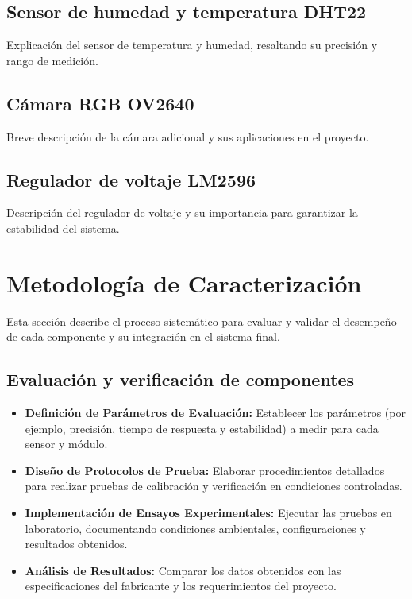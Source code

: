 \subsection{Sensor de humedad y temperatura DHT22}
Explicación del sensor de temperatura y humedad, resaltando su precisión y rango de medición.

\subsection{Cámara RGB OV2640}
Breve descripción de la cámara adicional y sus aplicaciones en el proyecto.

\subsection{Regulador de voltaje LM2596}
Descripción del regulador de voltaje y su importancia para garantizar la estabilidad del sistema.

\section{Metodología de Caracterización}
Esta sección describe el proceso sistemático para evaluar y validar el desempeño de cada componente y su integración en el sistema final.

\subsection{Evaluación y verificación de componentes}
\begin{itemize}
    \item \textbf{Definición de Parámetros de Evaluación:} Establecer los parámetros (por ejemplo, precisión, tiempo de respuesta y estabilidad) a medir para cada sensor y módulo.
    \item \textbf{Diseño de Protocolos de Prueba:} Elaborar procedimientos detallados para realizar pruebas de calibración y verificación en condiciones controladas.
    \item \textbf{Implementación de Ensayos Experimentales:} Ejecutar las pruebas en laboratorio, documentando condiciones ambientales, configuraciones y resultados obtenidos.
    \item \textbf{Análisis de Resultados:} Comparar los datos obtenidos con las especificaciones del fabricante y los requerimientos del proyecto.
\end{itemize}

